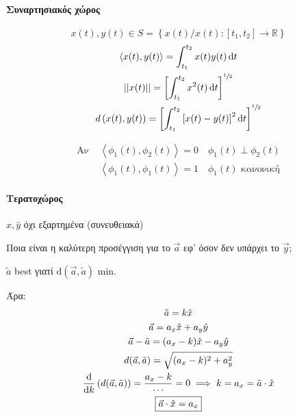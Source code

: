     \paragraph{Συναρτησιακός χώρος}
    \[
    x(t),y(t) \in S =
    \left\lbrace x(t)/x(t):[t_1,t_2]\to\mathbb R  \right\rbrace
    \]
    \begin{gather*}
    \left\langle
    x(t),y(t)
    \right\rangle  = \int_{t_1}^{t_2}x(t)y(t)\mathop{}\!\mathrm{d} t\\
    \left\vert\middle\vert x(t)\middle\vert\right\vert =
    \left[ \int_{t_1}^{t_2} x^2(t)\mathop{}\!\mathrm{d} t \right]^{\sfrac{1}{2}}\\
    d\left(
    x(t),y(t)
    \right)=\left[
    \int_{t_1}^{t_2} \left[ x(t)-y(t) \right]^2\mathop{}\!\mathrm{d} t
    \right]^{\sfrac{1}{2}}
    \end{gather*}
    
    \begin{align*}
    \text{Αν } & \left\langle \phi_1(t),\phi_2(t) \right\rangle
    = 0 \quad \phi_1(t) \perp \phi_2(t) \\
    & \left\langle \phi_1(t),\phi_1(t)\right\rangle = 1 \quad
    \phi_1(t) \text{ κανονική}
    \end{align*}

    \paragraph{Τερατοχώρος}
    
    
    \( \hat x,\hat y \) όχι εξαρτημένα (συνευθειακά)
    
    Ποια είναι η καλύτερη προσέγγιση για το \(\vec a\) εφ' όσον δεν υπάρχει
    το \( \vec y \);
    
    \( \tilde a \) best γιατί \(\mathrm d(\vec a,\tilde a)\) min.
    
    Άρα:
    \begin{gather*}
        \tilde a = k\hat x \\
        \vec a = a_x\hat x+a_y\hat y\\
        \vec a -\tilde a = (a_x-k)\hat x - a_y\hat y\\
        d(\vec a,\tilde a) = \sqrt{(a_x-k)^2+a_y^2} \\
        \od{}{k}\left( d(\vec a,\tilde a) \right) = \frac{a_x-k}{\cdots}
        = 0 \implies k=a_x = \tilde a \cdot \hat x\\
        \boxed{\vec a\cdot\hat x = a_x}
    \end{gather*}
    
